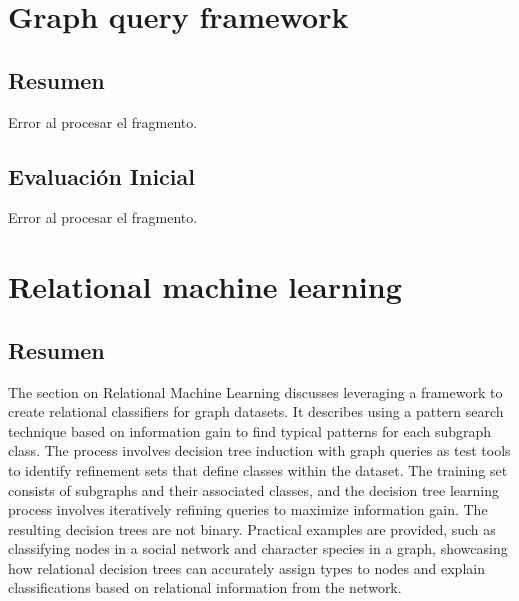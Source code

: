 \documentclass{article}%
\begin{document}
%
\section{Graph query framework}%
\label{sec:Graphqueryframework}%
\subsection{Resumen}%
\label{subsec:Resumen}%
Error al procesar el fragmento.

%
\subsection{Evaluación Inicial}%
\label{subsec:EvaluacinInicial}%
Error al procesar el fragmento.

%
\section{Relational machine learning}%
\label{sec:Relationalmachinelearning}%
\subsection{Resumen}%
\label{subsec:Resumen}%
The section on Relational Machine Learning discusses leveraging a framework to create relational classifiers for graph datasets. It describes using a pattern search technique based on information gain to find typical patterns for each subgraph class. The process involves decision tree induction with graph queries as test tools to identify refinement sets that define classes within the dataset. The training set consists of subgraphs and their associated classes, and the decision tree learning process involves iteratively refining queries to maximize information gain. The resulting decision trees are not binary. Practical examples are provided, such as classifying nodes in a social network and character species in a graph, showcasing how relational decision trees can accurately assign types to nodes and explain classifications based on relational information from the network.

%
\end{document}

